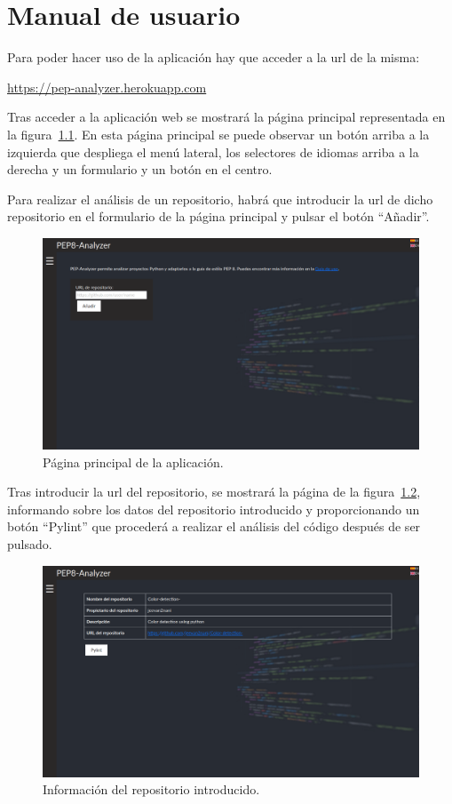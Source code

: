 \documentclass[a4paper, 12pt]{book}
\begin{document}
\cleardoublepage
\appendix
\chapter{Manual de usuario}
\label{app:manual}

Para poder hacer uso de la aplicación hay que acceder a la url de la misma:

\url{https://pep-analyzer.herokuapp.com}

Tras acceder a la aplicación web se mostrará la página principal representada en la figura~\ref{fig:paso1}.
En esta página principal se puede observar un botón arriba a la izquierda que despliega el menú lateral, los selectores de idiomas arriba a la derecha y un formulario y un botón en el centro.

Para realizar el análisis de un repositorio, habrá que introducir la url de dicho repositorio en el formulario de la página principal y pulsar el botón ``Añadir''.
\begin{figure}[h]
  \centering
  \includegraphics[width=13cm, keepaspectratio]{img/paso1.png}
  \caption{Página principal de la aplicación.}\label{fig:paso1}
\end{figure}
\newpage
Tras introducir la url del repositorio, se mostrará la página de la figura~\ref{fig:paso2}, informando sobre los datos del repositorio introducido y proporcionando un botón ``Pylint'' que procederá a realizar el análisis del código después de ser pulsado.
\begin{figure}[h]
  \centering
  \includegraphics[width=13cm, keepaspectratio]{img/paso2.png}
  \caption{Información del repositorio introducido.}\label{fig:paso2}
\end{figure}
\end{document}
